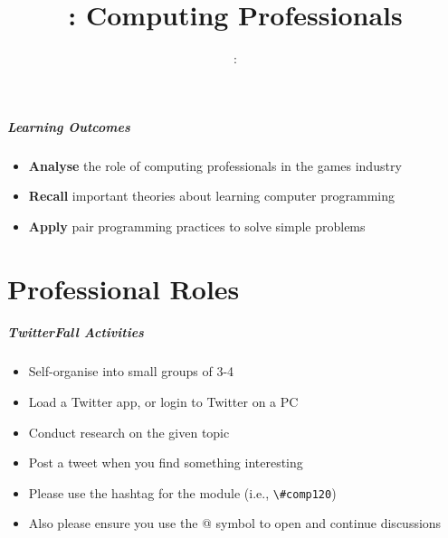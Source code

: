 \usepackage{../../beamerthemeFalmouthGamesAcademy}
\usepackage{multimedia}
\graphicspath{ {../../} }

\usepackage{textcomp}


\usepackage[normalem]{ulem}
\usepackage{wasysym}

\usepackage{pdfpages}

\usetikzlibrary{arrows,automata}




\title{\sessionnumber: Computing Professionals}
\subtitle{\modulecode: \moduletitle}

\frame{\titlepage} 

\begin{frame}
	\frametitle{Learning Outcomes}
	\begin{itemize}
		\item \textbf{Analyse} the role of computing professionals in the games industry
		\item \textbf{Recall} important theories about learning computer programming
		\item \textbf{Apply} pair programming practices to solve simple problems
	\end{itemize}
\end{frame}

\part{Professional Roles}
\frame{\partpage}

\begin{frame}
	\frametitle{TwitterFall Activities}
		
	\begin{itemize}
		\item Self-organise into small groups of 3-4
		\item Load a Twitter app, or login to Twitter on a PC
		\item Conduct research on the given topic
		\item Post a tweet when you find something interesting
	\end{itemize}

	\begin{itemize}
		\item Please use the hashtag for the module (i.e., \lstinline{\#comp120})
		\item Also please ensure you use the @ symbol to open and continue discussions
	\end{itemize}
\end{frame}

